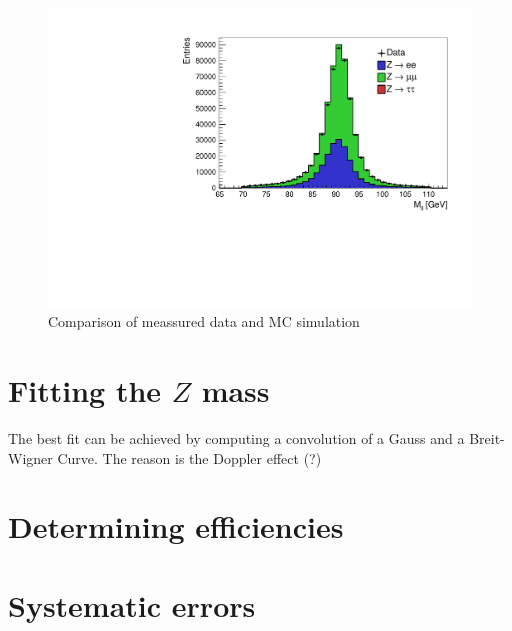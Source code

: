 \documentclass[12pt, a4paper, bibliography=totoc]{scrreprt}
\begin{document}
\begin{figure}[h]
	\centering
	\includegraphics[scale=0.5]{fig/vergleich_data_mc_final.pdf}
	\caption{Comparison of meassured data and MC simulation}
	\label{fig:data_mc}
\end{figure}

\section{Fitting the $Z$ mass}
The best fit can be achieved by computing a convolution of a Gauss and a Breit-Wigner Curve.
The reason is the Doppler effect (?)

\section{Determining efficiencies}


\section{Systematic errors}



\nocite{*}
\appendix
\printbibliography
\end{document}

